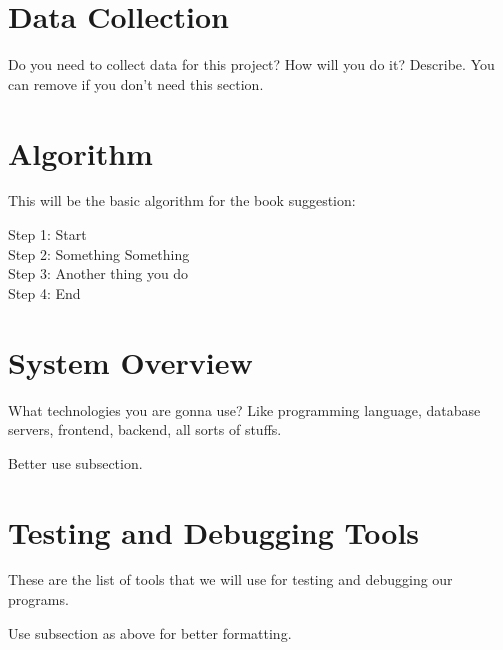 \section{Data Collection}
Do you need to collect data for this project? How will you do it? Describe. You can remove if you don't need this section.

\section{Algorithm}

This will be the basic algorithm for the book suggestion:

\noindent
Step 1: Start\\
Step 2: Something Something\\
Step 3: Another thing you do\\
Step 4: End


\section{System Overview}
What technologies you are gonna use? Like programming language, database servers, frontend, backend, all sorts of stuffs.

Better use subsection.

%


\section{Testing and Debugging Tools}

These are the list of tools that we will use for testing and debugging our programs.

Use subsection as above for better formatting.



